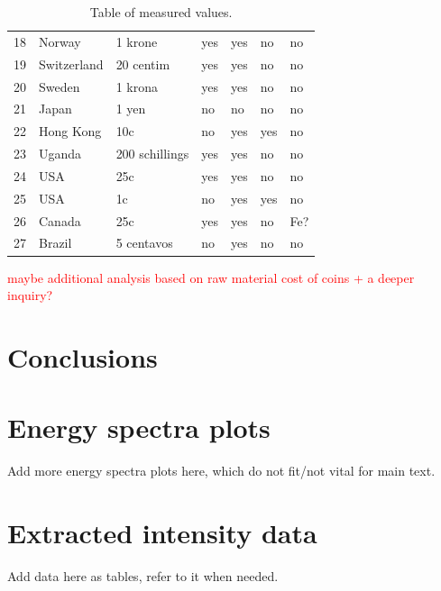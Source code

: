 \documentclass[11pt,a4paper,twoside,onecolumn]{article}
\newcommand{\reminder}[1]{\textcolor{red}{#1}}
\begin{document}
\begin{table}[!htbp]
\begin{tabular}{@{}lllllll@{}}
    18 & Norway         & 1 krone        & yes & yes & no  & no    \\
    19 & Switzerland    & 20 centim      & yes & yes & no  & no    \\
    20 & Sweden         & 1 krona        & yes & yes & no  & no    \\
    21 & Japan          & 1 yen          & no  & no  & no  & no    \\
    22 & Hong Kong      & 10c            & no  & yes & yes & no    \\
    23 & Uganda         & 200 schillings & yes & yes & no  & no    \\
    24 & USA            & 25c            & yes & yes & no  & no    \\
    25 & USA            & 1c             & no  & yes & yes & no    \\
    26 & Canada         & 25c            & yes & yes & no  & Fe?   \\
    27 & Brazil         & 5 centavos     & no  & yes & no  & no    \\ \bottomrule
    \end{tabular}
    \caption{Table of measured values.}
    \label{tab:coin-measured}
\end{table}

\reminder{maybe additional analysis based on raw material cost of coins + a deeper inquiry?}

\section{Conclusions}
\lipsum[1-5]

\newpage
\appendix
\section{Energy spectra plots}
Add more energy spectra plots here, which do not fit/not vital for main text.

\section{Extracted intensity data}
Add data here as tables, refer to it when needed.
\end{document}
